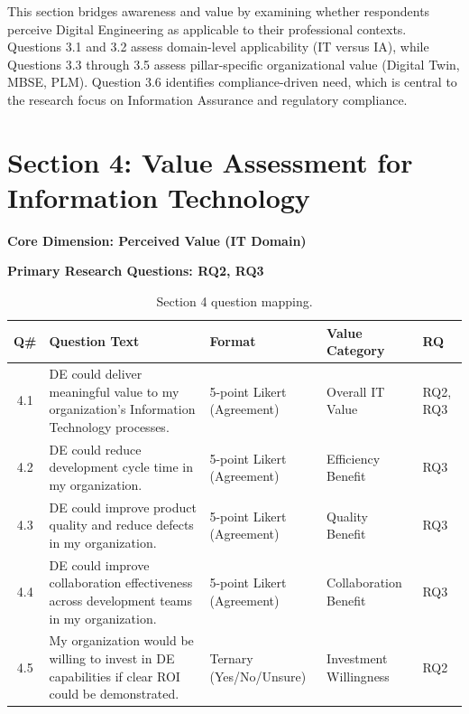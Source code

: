   This section bridges awareness and value by examining whether respondents perceive Digital Engineering as applicable to their professional contexts. Questions 3.1 and 3.2 assess domain-level applicability (IT versus IA), while Questions 3.3 through 3.5 assess pillar-specific organizational value (Digital Twin, MBSE, PLM). Question 3.6 identifies compliance-driven need, which is central to the research focus on Information Assurance and regulatory compliance.

  \section{Section 4: Value Assessment for Information Technology}

  \textbf{Core Dimension: Perceived Value (IT Domain)}

  \textbf{Primary Research Questions: RQ2, RQ3}

  \begin{table}[H]
    \centering
    \caption{Section 4 question mapping.}
    \label{tab:section4-mapping}
    \small
    \begin{tabular}{@{}cp{2in}p{0.9in}p{1in}l@{}}
      \toprule
      \textbf{Q\#} & \textbf{Question Text} & \textbf{Format} & \textbf{Value Category} & \textbf{RQ} \\
      \midrule
      4.1 & DE could deliver meaningful value to my organization's Information Technology processes. & 5-point Likert (Agreement) & Overall IT Value & RQ2, RQ3 \\
      4.2 & DE could reduce development cycle time in my organization. & 5-point Likert (Agreement) & Efficiency Benefit & RQ3 \\
      4.3 & DE could improve product quality and reduce defects in my organization. & 5-point Likert (Agreement) & Quality Benefit & RQ3 \\
      4.4 & DE could improve collaboration effectiveness across development teams in my organization. & 5-point Likert (Agreement) & Collaboration Benefit & RQ3 \\
      4.5 & My organization would be willing to invest in DE capabilities if clear ROI could be demonstrated. & Ternary (Yes/No/Unsure) & Investment Willingness & RQ2 \\
      \bottomrule
    \end{tabular}
  \end{table}

